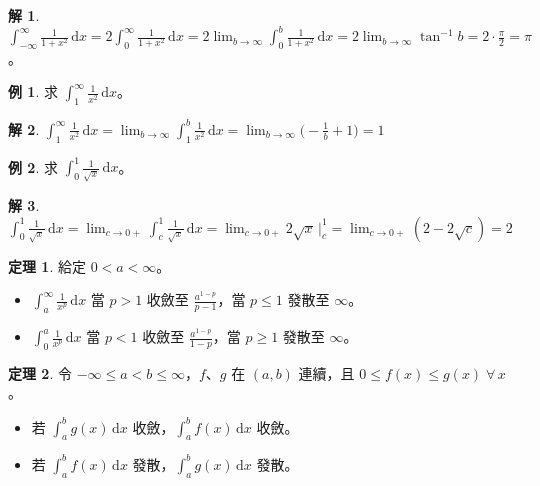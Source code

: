 \documentclass[12pt]{extarticle}
\newcommand{\ds}{\displaystyle}
\theoremstyle{definition}
\newtheorem*{thm}{定理}
\newtheorem*{ex}{例}
\newtheorem*{sol}{解}
\begin{document}
\begin{sol}
  $\ds\int_{-\infty}^{\infty}\!\frac{1}{1 + x^2}\,\mathrm{d}x = 2\int_0^\infty\!\frac{1}{1 + x^2}\,\mathrm{d}x = 2\lim_{b\to\infty}\int_0^b\!\frac{1}{1 + x^2}\,\mathrm{d}x = 2\lim_{b\to\infty}\tan^{-1} b = 2\cdot\frac{\pi}{2} = \pi$。
\end{sol}

\begin{ex}
  求 $\ds\int_{1}^{\infty}\!\frac{1}{x^2}\,\mathrm{d}x$。
\end{ex}

\begin{sol}
  $\ds\int_{1}^{\infty}\!\frac{1}{x^2}\,\mathrm{d}x = \lim_{b\to\infty}\int_1^b\!\frac{1}{x^2}\,\mathrm{d}x = \lim_{b\to\infty}\big(-\frac{1}{b} + 1\big) = 1$
\end{sol}

\begin{ex}
  求 $\ds\int_0^1\!\frac{1}{\sqrt{x}}\,\mathrm{d}x$。
\end{ex}

\begin{sol}
  $\ds\int_0^1\!\frac{1}{\sqrt{x}}\,\mathrm{d}x = \lim_{c\to0+}\int_c^1\!\frac{1}{\sqrt{x}}\,\mathrm{d}x = \lim_{c\to0+}2\sqrt{x}\,\Big|^1_c = \lim_{c\to0+}(2-2\sqrt{c}) = 2$
\end{sol}

\begin{thm} 給定 $\ds 0 < a < \infty$。
  \begin{itemize}\setlength{\itemsep}{0pt}
    \item $\ds\int_a^\infty\!\frac{1}{x^p}\,\mathrm{d}x$ 當 $p > 1$ 收斂至 $\ds\frac{a^{1-p}}{p - 1}$，當 $\ds p\leqslant 1$ 發散至 $\infty$。
    \item $\ds\int_0^{a}\!\frac{1}{x^p}\,\mathrm{d}x$ 當 $p < 1$ 收斂至 $\ds\frac{a^{1-p}}{1 - p}$，當 $p\geqslant 1$ 發散至 $\infty$。
  \end{itemize}
\end{thm}

\begin{thm}
  令 $\ds -\infty\leqslant a < b \leqslant\infty$，$f$、$g$ 在 $(a, b)$ 連續，且 $0\leqslant f(x)\leqslant g(x)\;\forall\,x$。
  \begin{itemize}\setlength{\itemsep}{0pt}
    \item 若 $\ds\int_a^b g(x)\,\mathrm{d}x$ 收斂，$\ds\int_a^b f(x)\,\mathrm{d}x$ 收斂。
    \item 若 $\ds\int_a^b f(x)\,\mathrm{d}x$ 發散，$\ds\int_a^b g(x)\,\mathrm{d}x$ 發散。
  \end{itemize}
\end{thm}
\end{document}
